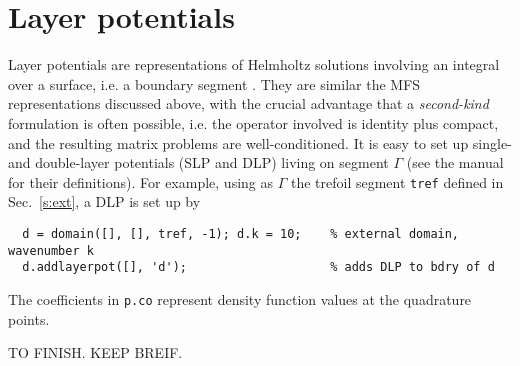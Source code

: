\section{Layer potentials}
\label{s:layer}

Layer potentials are representations of Helmholtz solutions
involving an integral over a surface, i.e. a boundary segment
\cite{coltonkress}.
They are similar the MFS representations discussed above, with the
crucial advantage that a {\em second-kind}
formulation is often possible, i.e. the operator involved is
identity plus compact, and the resulting matrix problems are well-conditioned.
It is easy to set up single- and double-layer potentials (SLP and
DLP) living on
segment $\Gamma$ (see the manual for their definitions).
For example, using as $\Gamma$ the
trefoil segment {\tt tref} defined in Sec.~\ref{s:ext}, a DLP is set up
by
\begin{verbatim}
  d = domain([], [], tref, -1); d.k = 10;    % external domain, wavenumber k
  d.addlayerpot([], 'd');                    % adds DLP to bdry of d
\end{verbatim}

The coefficients in {\tt p.co} represent density function values
at the quadrature points.

TO FINISH. KEEP BREIF.


